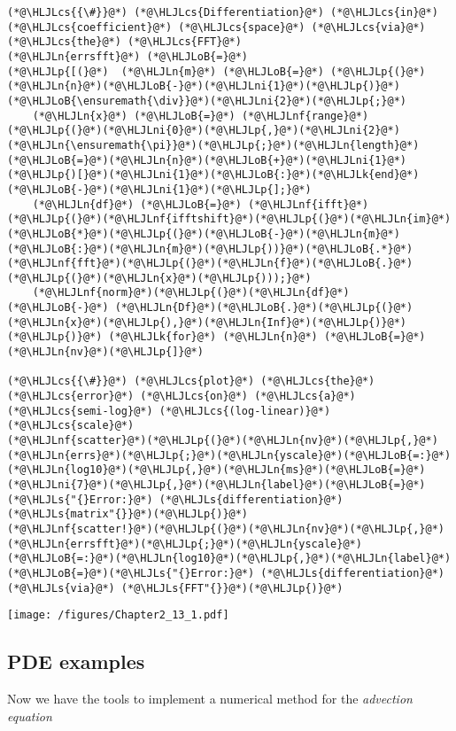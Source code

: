 \documentclass[12pt,landscape]{article}
\newcommand{\HLJLk}[1]{\textcolor[RGB]{148,91,176}{\textbf{#1}}}
\newcommand{\HLJLn}[1]{#1}
\newcommand{\HLJLnf}[1]{\textcolor[RGB]{66,102,213}{#1}}
\newcommand{\HLJLs}[1]{\textcolor[RGB]{201,61,57}{#1}}
\newcommand{\HLJLni}[1]{\textcolor[RGB]{59,151,46}{#1}}
\newcommand{\HLJLoB}[1]{\textcolor[RGB]{102,102,102}{\textbf{#1}}}
\newcommand{\HLJLp}[1]{#1}
\newcommand{\HLJLcs}[1]{\textcolor[RGB]{153,153,119}{\textit{#1}}}
\begin{document}
{\begin{lstlisting}
(*@\HLJLcs{{\#}}@*) (*@\HLJLcs{Differentiation}@*) (*@\HLJLcs{in}@*) (*@\HLJLcs{coefficient}@*) (*@\HLJLcs{space}@*) (*@\HLJLcs{via}@*) (*@\HLJLcs{the}@*) (*@\HLJLcs{FFT}@*)
(*@\HLJLn{errsfft}@*) (*@\HLJLoB{=}@*) 
(*@\HLJLp{[(}@*)  (*@\HLJLn{m}@*) (*@\HLJLoB{=}@*) (*@\HLJLp{(}@*)(*@\HLJLn{n}@*)(*@\HLJLoB{-}@*)(*@\HLJLni{1}@*)(*@\HLJLp{)}@*)(*@\HLJLoB{\ensuremath{\div}}@*)(*@\HLJLni{2}@*)(*@\HLJLp{;}@*)
    (*@\HLJLn{x}@*) (*@\HLJLoB{=}@*) (*@\HLJLnf{range}@*)(*@\HLJLp{(}@*)(*@\HLJLni{0}@*)(*@\HLJLp{,}@*)(*@\HLJLni{2}@*)(*@\HLJLn{\ensuremath{\pi}}@*)(*@\HLJLp{;}@*)(*@\HLJLn{length}@*)(*@\HLJLoB{=}@*)(*@\HLJLn{n}@*)(*@\HLJLoB{+}@*)(*@\HLJLni{1}@*)(*@\HLJLp{)[}@*)(*@\HLJLni{1}@*)(*@\HLJLoB{:}@*)(*@\HLJLk{end}@*)(*@\HLJLoB{-}@*)(*@\HLJLni{1}@*)(*@\HLJLp{];}@*)
    (*@\HLJLn{df}@*) (*@\HLJLoB{=}@*) (*@\HLJLnf{ifft}@*)(*@\HLJLp{(}@*)(*@\HLJLnf{ifftshift}@*)(*@\HLJLp{(}@*)(*@\HLJLn{im}@*)(*@\HLJLoB{*}@*)(*@\HLJLp{(}@*)(*@\HLJLoB{-}@*)(*@\HLJLn{m}@*)(*@\HLJLoB{:}@*)(*@\HLJLn{m}@*)(*@\HLJLp{))}@*)(*@\HLJLoB{.*}@*)(*@\HLJLnf{fft}@*)(*@\HLJLp{(}@*)(*@\HLJLn{f}@*)(*@\HLJLoB{.}@*)(*@\HLJLp{(}@*)(*@\HLJLn{x}@*)(*@\HLJLp{)));}@*)
    (*@\HLJLnf{norm}@*)(*@\HLJLp{(}@*)(*@\HLJLn{df}@*) (*@\HLJLoB{-}@*) (*@\HLJLn{Df}@*)(*@\HLJLoB{.}@*)(*@\HLJLp{(}@*)(*@\HLJLn{x}@*)(*@\HLJLp{),}@*)(*@\HLJLn{Inf}@*)(*@\HLJLp{)}@*) (*@\HLJLp{)}@*) (*@\HLJLk{for}@*) (*@\HLJLn{n}@*) (*@\HLJLoB{=}@*) (*@\HLJLn{nv}@*)(*@\HLJLp{]}@*)

(*@\HLJLcs{{\#}}@*) (*@\HLJLcs{plot}@*) (*@\HLJLcs{the}@*) (*@\HLJLcs{error}@*) (*@\HLJLcs{on}@*) (*@\HLJLcs{a}@*) (*@\HLJLcs{semi-log}@*) (*@\HLJLcs{(log-linear)}@*) (*@\HLJLcs{scale}@*)
(*@\HLJLnf{scatter}@*)(*@\HLJLp{(}@*)(*@\HLJLn{nv}@*)(*@\HLJLp{,}@*)(*@\HLJLn{errs}@*)(*@\HLJLp{;}@*)(*@\HLJLn{yscale}@*)(*@\HLJLoB{=:}@*)(*@\HLJLn{log10}@*)(*@\HLJLp{,}@*)(*@\HLJLn{ms}@*)(*@\HLJLoB{=}@*)(*@\HLJLni{7}@*)(*@\HLJLp{,}@*)(*@\HLJLn{label}@*)(*@\HLJLoB{=}@*)(*@\HLJLs{"{}Error:}@*) (*@\HLJLs{differentiation}@*) (*@\HLJLs{matrix"{}}@*)(*@\HLJLp{)}@*)
(*@\HLJLnf{scatter!}@*)(*@\HLJLp{(}@*)(*@\HLJLn{nv}@*)(*@\HLJLp{,}@*)(*@\HLJLn{errsfft}@*)(*@\HLJLp{;}@*)(*@\HLJLn{yscale}@*)(*@\HLJLoB{=:}@*)(*@\HLJLn{log10}@*)(*@\HLJLp{,}@*)(*@\HLJLn{label}@*)(*@\HLJLoB{=}@*)(*@\HLJLs{"{}Error:}@*) (*@\HLJLs{differentiation}@*) (*@\HLJLs{via}@*) (*@\HLJLs{FFT"{}}@*)(*@\HLJLp{)}@*)
\end{lstlisting}

\texttt{[image: /figures/Chapter2\_13\_1.pdf]}

\subsection{PDE examples}
Now we have the tools to implement a numerical method for the \emph{advection equation}

}
\end{document}
